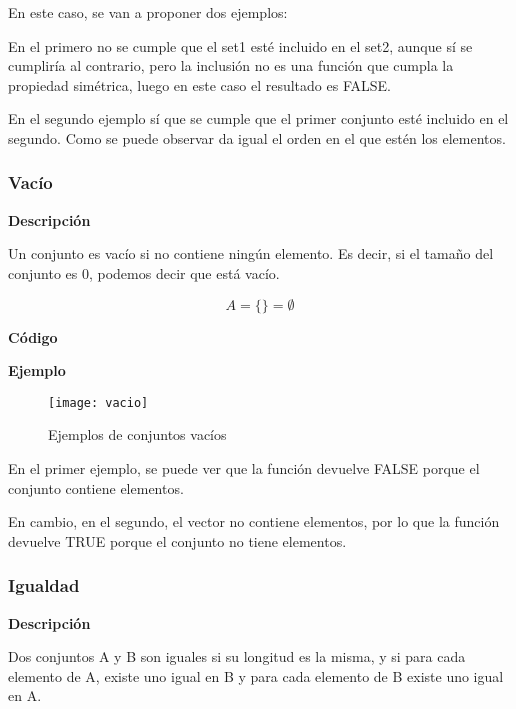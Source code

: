    En este caso, se van a proponer dos ejemplos:

    En el primero no se cumple que el set1 est\'e incluido en el set2, aunque s\'i se cumplir\'ia al contrario, pero la inclusi\'on no es 
    una funci\'on que cumpla la propiedad sim\'etrica, luego en este caso el resultado es FALSE.

    En el segundo ejemplo s\'i que se cumple que el primer conjunto est\'e incluido en el segundo. Como se puede observar da igual el orden 
    en el que est\'en los elementos.



\subsubsection{Vac\'io}

    \textbf{Descripci\'on}

    Un conjunto es vac\'io si no contiene ning\'un elemento. Es decir, si el tama\~no del conjunto es 0, 
    podemos decir que est\'a vac\'io. 

    \[
        A = \{ \} = \emptyset
    \]

    \textbf{C\'odigo}

    
    \bigskip

    \textbf{Ejemplo}

    \begin{figure}[H]
        \centering
        \texttt{[image: vacio]}
        \caption{Ejemplos de conjuntos vac\'ios}
        \label{fig:vacio}
    \end{figure}

    En el primer ejemplo, se puede ver que la funci\'on devuelve FALSE porque el conjunto contiene elementos.

    En cambio, en el segundo, el vector no contiene elementos, por lo que la funci\'on devuelve TRUE porque el conjunto no tiene 
    elementos.



\subsubsection{Igualdad}

    \textbf{Descripci\'on}

    Dos conjuntos A y B son iguales si su longitud es la misma, y si para cada elemento de A, existe uno igual 
    en B y para cada elemento de B existe uno igual en A.

